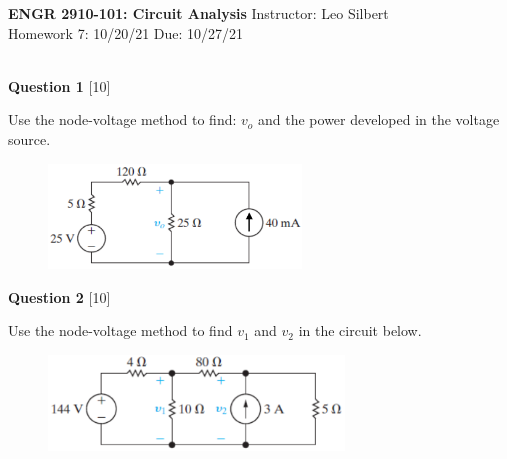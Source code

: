 \documentclass[12pt]{article}
\newcommand{\bit}{\begin{itemize}}
\newcommand{\eit}{\end{itemize}}
\begin{document}

\begin{center}
\hfil
{\large\bf {ENGR 2910-101: Circuit Analysis}}
\hfill Instructor: Leo Silbert \\
Homework 7: 10/20/21 \hfill Due: 10/27/21\\
\hrulefill\\
\end{center}




\noindent
{\bf Question 1} [10]

Use the node-voltage method to find: $v_{o}$ and the power developed in the voltage source.

\begin{figure}[h!]
  \centering 
 \vspace{-0.1in}
 \includegraphics[clip,width=0.6\textwidth]{Fig4-6-v2.png}
\end{figure}
%

%
% 
%
%

\vspace{0.1in}
\noindent
{\bf Question 2} [10]

Use the node-voltage method to find $v_{1}$ and $v_{2}$ in the circuit below.
\begin{figure}[h!]
     \centering
\vspace{-0.1in}
     \includegraphics[clip,width=0.7\textwidth]{Fig4-11.png}
\vspace{-0.15in}
\end{figure}
\end{document}
